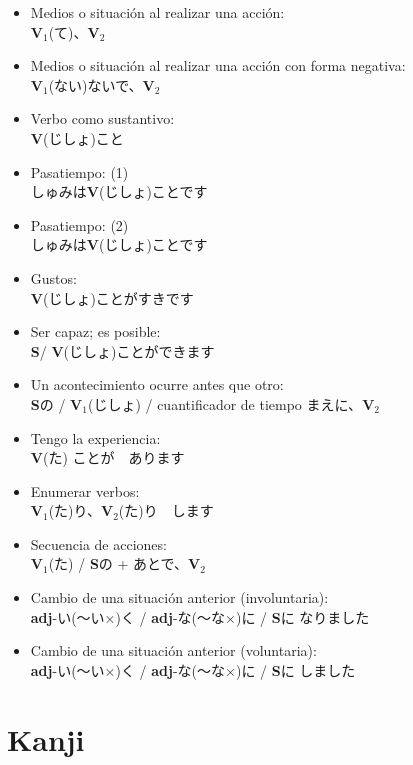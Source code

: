 \documentclass[a4paper,12pt,oneside]{report}
\def\bv{\textbf{V}} %
\def\bs{\textbf{S}} %
\def\adj{\textbf{adj}} %
\def\vi{$\mathrm{\bv}_1$} %
\def\vn{$\mathrm{\bv}_2$} %
\begin{document}
\begin{CJK*}{UTF8}{min}
\begin{itemize}
          \bv(ない)なくてもいいです
    \item Medios o situación al realizar una acción:\\
          \vi(て)、\vn
    \item Medios o situación al realizar una acción con forma negativa:\\
          \vi(ない)ないで、\vn
    \item Verbo como sustantivo:\\
          \bv(じしょ)こと
    \item Pasatiempo: (1)\\
          しゅみは\bv(じしょ)ことです
    \item Pasatiempo: (2)\\
          しゅみは\bv(じしょ)ことです
    \item Gustos:\\
          \bv(じしょ)ことがすきです
    \item Ser capaz; es posible:\\
          \bs / \bv(じしょ)ことができます
    \item Un acontecimiento ocurre antes que otro:\\
          \bs{の} / \vi(じしょ) / cuantificador de tiempo まえに、\vn
    \item Tengo la experiencia:\\
          \bv(た) ことが　あります
    \item Enumerar verbos:\\
          \vi(た)り、\vn(た)り　します
    \item Secuencia de acciones:\\
          \vi(た) / \bs {の} + あとで、\vn
    \item Cambio de una situaci\'on anterior (involuntaria):\\
          \adj-い(〜い×){く} / \adj-な(〜な×){に} / \bs{に} なりました
    \item Cambio de una situaci\'on anterior (voluntaria):\\
          \adj-い(〜い×){く} / \adj-な(〜な×){に} / \bs{に} しました
  \end{itemize}


\chapter{Kanji}
  \thispagestyle{contenido} %
  \pagestyle{contenido}     %


\end{CJK*}
\end{document}
